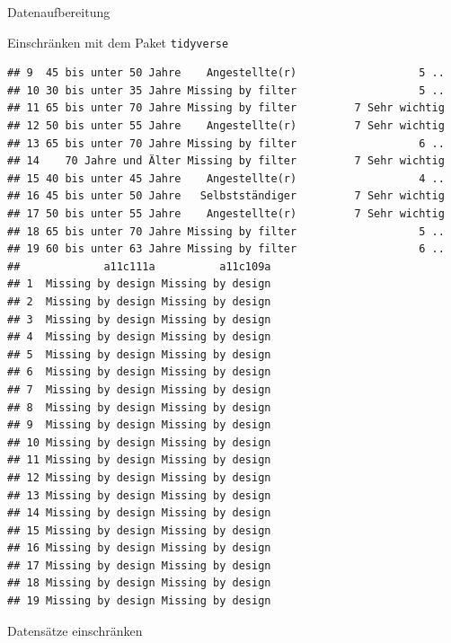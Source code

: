 \documentclass[ignorenonframetext,]{beamer}
\newenvironment{Shaded}{}{}
\newcommand{\StringTok}[1]{\textcolor[rgb]{0.25,0.44,0.63}{{#1}}}
\newcommand{\NormalTok}[1]{{#1}}
\begin{document}
\begin{frame}[fragile]{Datenaufbereitung}
\begin{block}{Einschränken mit dem Paket \texttt{tidyverse}}
\begin{verbatim}
## 9  45 bis unter 50 Jahre    Angestellte(r)                   5 ..
## 10 30 bis unter 35 Jahre Missing by filter                   5 ..
## 11 65 bis unter 70 Jahre Missing by filter         7 Sehr wichtig
## 12 50 bis unter 55 Jahre    Angestellte(r)         7 Sehr wichtig
## 13 65 bis unter 70 Jahre Missing by filter                   6 ..
## 14    70 Jahre und Älter Missing by filter         7 Sehr wichtig
## 15 40 bis unter 45 Jahre    Angestellte(r)                   4 ..
## 16 45 bis unter 50 Jahre   Selbstständiger         7 Sehr wichtig
## 17 50 bis unter 55 Jahre    Angestellte(r)         7 Sehr wichtig
## 18 65 bis unter 70 Jahre Missing by filter                   5 ..
## 19 60 bis unter 63 Jahre Missing by filter                   6 ..
##             a11c111a          a11c109a
## 1  Missing by design Missing by design
## 2  Missing by design Missing by design
## 3  Missing by design Missing by design
## 4  Missing by design Missing by design
## 5  Missing by design Missing by design
## 6  Missing by design Missing by design
## 7  Missing by design Missing by design
## 8  Missing by design Missing by design
## 9  Missing by design Missing by design
## 10 Missing by design Missing by design
## 11 Missing by design Missing by design
## 12 Missing by design Missing by design
## 13 Missing by design Missing by design
## 14 Missing by design Missing by design
## 15 Missing by design Missing by design
## 16 Missing by design Missing by design
## 17 Missing by design Missing by design
## 18 Missing by design Missing by design
## 19 Missing by design Missing by design
\end{verbatim}

\end{block}

\begin{block}{Datensätze einschränken}

\begin{Shaded}
\end{Shaded}


\end{block}
\end{frame}
\end{document}
